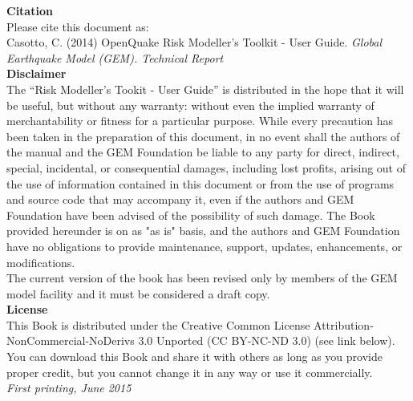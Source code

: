 \noindent
   {\textbf{Citation}} \hfill \\
   Please cite this document as:\\
   Casotto, C. (2014) OpenQuake Risk Modeller's Toolkit - User Guide. \textit{Global Earthquake Model (GEM). Technical Report}\\

   {\bf{Disclaimer}} \hfill \\
\noindent
   The ``Risk Modeller's Tookit - User Guide'' is distributed in the hope 
   that it will be useful, but without any warranty: without 
   even the implied warranty of merchantability or fitness for a 
   particular purpose. While every 
   precaution has been taken in the preparation of this document, in 
   no event shall the authors of the manual and the GEM Foundation be 
   liable to any party for direct, indirect, special, incidental, or 
   consequential damages, including lost profits, arising out of the 
   use of information contained in this document or from the use of 
   programs and source code that may accompany it, even if the authors 
   and GEM Foundation have been advised of the possibility of such damage. 
   The Book provided hereunder is on as "as is" basis, and the authors 
   and GEM Foundation have no obligations to provide maintenance, support,
   updates, enhancements, or modifications. 
   \hfill \\
   The current version of the book has been revised only by members of 
   the GEM model facility and it must be considered a draft copy. 
   \vspace{0.4cm} \hfill \\
   {\bf{License}} \hfill \\
   This Book is distributed under the Creative Common License 
   Attribution-NonCommercial-NoDerivs 3.0 Unported (CC BY-NC-ND 3.0) 
   (see link below). You can download this Book and share it with 
   others as long as you provide proper credit, but you cannot change 
   it in any way or use it commercially. 
   \hfill \\

\noindent \textit{First printing, June 2015} %



